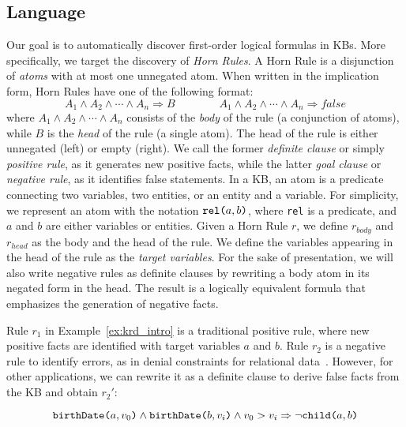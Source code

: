 \subsection{Language} \label{sec:krd_language} 
Our goal is to automatically discover first-order logical formulas in KBs. More specifically, we target the discovery of \emph{Horn Rules}. A Horn Rule is a disjunction of \emph{atoms} with at most one unnegated atom. When written in the implication form, Horn Rules have one of the following format:
%
\begin{equation*}
	A_1 \wedge A_2 \wedge \cdots \wedge A_n \Rightarrow B \qquad \qquad A_1 \wedge A_2 \wedge \cdots \wedge A_n \Rightarrow  false 
\end{equation*} %
%
where $A_1 \wedge A_2 \wedge \cdots \wedge A_n$ consists of the \emph{body} of the rule (a conjunction of atoms), while $B$ is the \emph{head} of the rule (a single atom). The head of the rule is either unnegated (left) or empty (right). We call the former \emph{definite clause} or simply \emph{positive rule}, as it generates new positive facts, while the latter \emph{goal clause} or \emph{negative rule}, as it identifies false statements. In a KB, an atom is a predicate connecting two variables, two entities, or an entity and a variable. For simplicity, we represent an atom with the notation $\texttt{rel(}a,b\texttt{)}$, where \texttt{rel} is a predicate, and $a$ and $b$ are either variables or entities. 
Given a Horn Rule $r$, we define $r_{body}$ and $r_{head}$ as the body and the head of the rule. We define the variables appearing in the head of the rule as the \emph{target variables}. 
For the sake of presentation, we will also write negative rules as definite clauses by rewriting a body atom in its negated form in the head. The result is a logically equivalent formula that emphasizes the generation of negative facts.

\begin{example}\label{ex:ex2}
	Rule $r_1$ in Example~\ref{ex:krd_intro} is a traditional positive rule, where new positive facts are identified with target variables $a$ and $b$.
	Rule $r_2$ is a negative rule to identify errors, as in denial constraints for relational data~\cite{chu2013discovering}. However, for other applications, we can rewrite it as a definite clause to derive false facts from the KB and obtain $r_2'$:
	
	\vspace{-3.5ex}
	{\small	
		\begin{equation*}
			\texttt{birthDate(}a,v_0\texttt{)} \wedge \texttt{birthDate(}b,v_i\texttt{)} \wedge v_0 > v_i
			\Rightarrow  \neg \texttt{child(}a,b\texttt{)}  
		\end{equation*}
	}
	\vspace{-2.5ex}
\end{example} 

